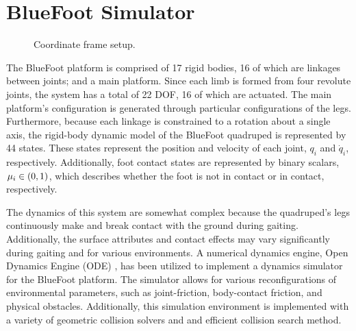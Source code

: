 	\section{BlueFoot Simulator}
%
		\begin{figure}[h!]
			\centering
			\caption{Coordinate frame setup.}
			\label{fig::narx_net}
		\end{figure}
%
		The BlueFoot platform is comprised of 17 rigid bodies, 16 of which are linkages between joints; and a main platform. Since each limb is formed from four revolute joints, the system has a total of 22 DOF, 16 of which are actuated. The main platform's configuration is generated through particular configurations of the legs. Furthermore, because each linkage is constrained to a rotation about a single axis, the rigid-body dynamic model of the BlueFoot quadruped is represented by 44 states. These states represent the position and velocity of each joint, $q_{i}$ and $\dot{q}_{i}$, respectively. Additionally, foot contact states are represented by binary scalars, $\mu_{i} \in \left(0,1\right)$, which describes whether the foot is not in contact or in contact, respectively.

		The dynamics of this system are somewhat complex because the quadruped's legs continuously make and break contact with the ground during gaiting. Additionally, the surface attributes and contact effects may vary significantly during gaiting and for various environments. A numerical dynamics engine, Open Dynamics Engine (ODE) \cite{ODE_Website}, has been utilized to implement a dynamics simulator for the BlueFoot platform. The simulator allows for various reconfigurations of environmental parameters, such as joint-friction, body-contact friction, and physical obstacles. Additionally, this simulation environment is implemented with a variety of geometric collision solvers and and efficient collision search method.

